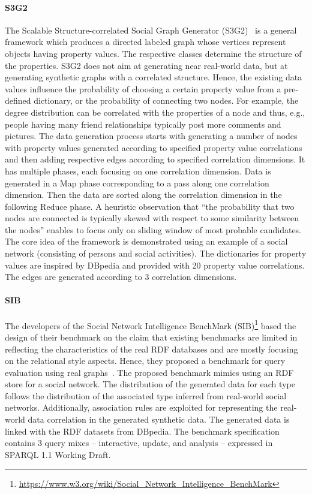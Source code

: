 \paragraph{S3G2} The Scalable Structure-correlated Social Graph Generator
(S3G2)~\cite{Pham2013} is a general framework which produces a directed labeled
graph whose vertices represent objects having property values. The respective
classes determine the structure of the properties. S3G2 does not aim at
generating near real-world data, but at generating synthetic graphs with a
correlated structure. Hence, the existing data values influence the probability
of choosing a certain property value from a pre-defined dictionary, or the
probability of connecting two nodes. For example, the degree distribution can be
correlated with the properties of a node and thus, e.g., people having many
friend relationships typically post more comments and pictures. The data
generation process starts with generating a number of nodes with property values
generated according to specified property value correlations and then adding
respective edges according to specified correlation dimensions. It has multiple
phases, each focusing on one correlation dimension. Data is generated in a Map
phase corresponding to a pass along one correlation dimension. Then the data are
sorted along the correlation dimension in the following Reduce phase. A
heuristic observation that ``the probability that two nodes are connected is
typically skewed with respect to some similarity between the nodes'' enables to
focus only on sliding window of most probable candidates. The core idea of the
framework is demonstrated using an example of a social network (consisting of
persons and social activities).  The dictionaries for property values are
inspired by DBpedia and provided with 20 property value correlations. The edges
are generated according to 3 correlation dimensions.


\paragraph{SIB} The developers of the Social Network Intelligence BenchMark (SIB)\footnote{\url{https://www.w3.org/wiki/Social_Network_Intelligence_BenchMark}} based the design of their benchmark on the claim that existing benchmarks are limited in reflecting the characteristics of the real RDF databases and are mostly focusing on the relational style aspects. Hence, they proposed a benchmark for  query evaluation using real graphs~\cite{sib}. The proposed benchmark mimics using an RDF store for a social network. \iffalse site where users and their interactions form a social graph of social activities such as creating/managing groups, writing posts and posting comments.\fi The distribution of the generated data for each type follows the  distribution of the associated type inferred from real-world social networks. Additionally, association rules are exploited for representing the real-world data correlation in the generated synthetic data. The  generated data is linked with the RDF datasets from DBpedia. The benchmark specification contains 3 query mixes -- interactive, update, and analysis -- expressed in SPARQL 1.1 Working Draft.

